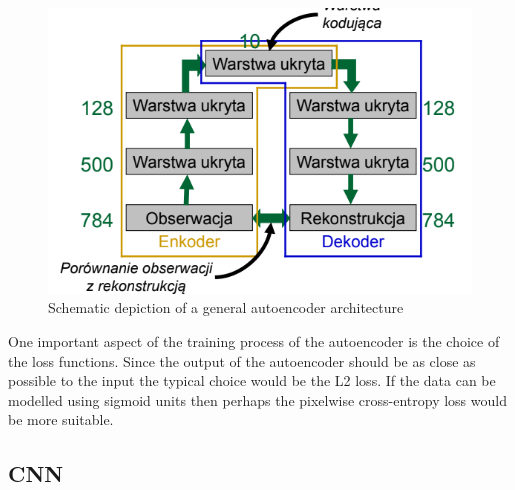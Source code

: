 \documentclass{myclass}
\begin{document}
\begin{figure}[ht]
   \centering
   \includegraphics[width=0.95\columnwidth]{figs/autoencoder.png}
   \caption{Schematic depiction of a general autoencoder architecture}
   \label{fig:ae}
\end{figure}

One important aspect of the training process of the autoencoder is the choice of the loss functions.
Since the output of the autoencoder should be as close as possible to the input the typical choice
would be the L2 loss. If the data can be modelled using sigmoid units then perhaps the pixelwise
cross-entropy loss would be more suitable.

\subsection{CNN}
\end{document}

